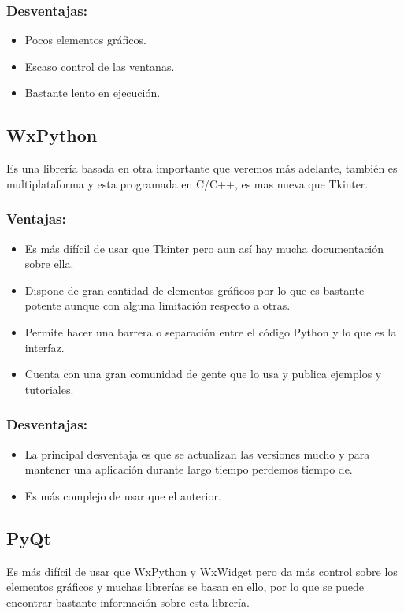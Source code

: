 \subsubsection{Desventajas:}
\begin{itemize}
\item Pocos elementos gráficos.
\item Escaso control de las ventanas.
\item Bastante lento en ejecución.
\end{itemize}

\subsection{WxPython}
Es una librería basada en otra importante que veremos más adelante, también es multiplataforma y esta programada en C/C++, es mas nueva que Tkinter.
\subsubsection{Ventajas:}
\begin{itemize}
\item Es más difícil de usar que Tkinter pero aun así hay mucha documentación sobre ella.

\item Dispone de gran cantidad de elementos gráficos por lo que es bastante potente aunque con alguna limitación respecto a otras.

\item Permite hacer una barrera o separación entre el código Python y lo que es la interfaz.
\item Cuenta con una gran comunidad de gente que lo usa y publica ejemplos y tutoriales.
\end{itemize}

\subsubsection{Desventajas:}
\begin{itemize}
\item La principal desventaja es que se actualizan las versiones mucho y para mantener una aplicación durante largo tiempo perdemos tiempo de.
\item Es más complejo de usar que el anterior.
\end{itemize}

\subsection{PyQt}
Es más difícil de usar que WxPython y WxWidget pero da más control sobre los elementos gráficos y muchas librerías se basan en ello, por lo que se puede encontrar bastante información sobre esta librería.


